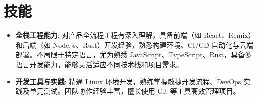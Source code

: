 \documentclass{resume}
\newcommand{\en}[1]{}
\newcommand{\zh}[1]{#1}
\begin{document}
\section{\en{Skills}\zh{技能}}
\begin{itemize}[parsep=0.25ex]
      \item \en{\textbf{Full-Stack Engineering}: Deep understanding of the full product engineering lifecycle with hands-on experience in frontend (React, Remix) and backend (Node.js, Rust). Proficient in build environments, CI/CD automation, and cloud deployment. Not limited to any specific language—expertise in JavaScript, TypeScript, and Rust—highly adaptable to varied tech stacks and project needs.}
            \zh{\textbf{全栈工程能力}: 对产品全流程工程有深入理解，具备前端（如 React、Remix）和后端（如 Node.js、Rust）开发经验，熟悉构建环境、CI/CD 自动化与云端部署。不局限于特定语言，尤为熟悉 JavaScript、TypeScript、Rust，具备多语言开发能力，能够灵活适应不同技术栈和项目需求。}
      \item \en{\textbf{Developing Tools \& Practices}: Proficient in Linux development, agile workflows, DevOps practices, and unit testing. Extensive team collaboration experience, highly skilled with Git for efficient project management.}
            \zh{\textbf{开发工具与实践}: 精通 Linux 环境开发，熟练掌握敏捷开发流程、DevOps 实践及单元测试。团队协作经验丰富，擅长使用 Git 等工具高效管理项目。}
\end{itemize}
\end{document}
